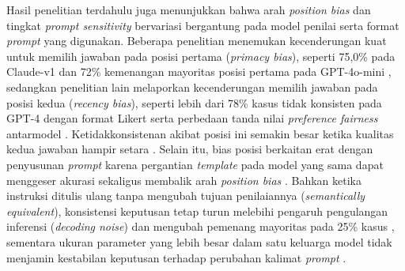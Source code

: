 Hasil penelitian terdahulu juga menunjukkan bahwa arah \textit{position bias} dan tingkat \textit{prompt sensitivity} bervariasi bergantung pada model penilai serta format \textit{prompt} yang digunakan. Beberapa penelitian menemukan kecenderungan kuat untuk memilih jawaban pada posisi pertama (\textit{primacy bias}), seperti 75,0\% pada Claude-v1 \cite{zhengJudgingLLMasaJudgeMTBench2023} dan 72\% kemenangan mayoritas posisi pertama pada GPT-4o-mini \cite{yagubyanCoinFlipJudge2026}, sedangkan penelitian lain melaporkan kecenderungan memilih jawaban pada posisi kedua (\textit{recency bias}), seperti lebih dari 78\% kasus tidak konsisten pada GPT-4 dengan format Likert \cite{liSplitMergeAligning2024} serta perbedaan tanda nilai \textit{preference fairness} antarmodel \cite{shiJudgingJudgesSystematic}. Ketidakkonsistenan akibat posisi ini semakin besar ketika kualitas kedua jawaban hampir setara \cite{shiJudgingJudgesSystematic}\cite{yagubyanCoinFlipJudge2026}. Selain itu, bias posisi berkaitan erat dengan penyusunan \textit{prompt} karena pergantian \textit{template} pada model yang sama dapat menggeser akurasi sekaligus membalik arah \textit{position bias} \cite{weiSystematicEvaluationLLMasaJudge2025}. Bahkan ketika instruksi ditulis ulang tanpa mengubah tujuan penilaiannya (\textit{semantically equivalent}), konsistensi keputusan tetap turun melebihi pengaruh pengulangan inferensi (\textit{decoding noise}) \cite{bellibatluJudgeSenseBenchmarkPrompt2026} dan mengubah pemenang mayoritas pada 25\% kasus \cite{yagubyanCoinFlipJudge2026}, sementara ukuran parameter yang lebih besar dalam satu keluarga model tidak menjamin kestabilan keputusan terhadap perubahan kalimat \textit{prompt} \cite{bellibatluJudgeSenseBenchmarkPrompt2026}.

